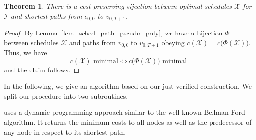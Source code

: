 \documentclass[hidelinks]{article}
\theoremstyle{plain}
\newtheorem{thm}{Theorem}[section]
\theoremstyle{definition}
\theoremstyle{rem}
\newcommand{\mx}{\mathcal{X}}
\newcommand{\inp}{\mathcal{I}}
\newcommand{\costs}{c}
\begin{document}
\begin{thm}\label{thm_opt_sched_short_path_pseudo_poly}
There is a cost-preserving bijection between optimal schedules $\mx$ for $\inp$ and shortest paths from $v_{0,0}$ to $v_{0,T+1}$.
\end{thm} 
\begin{proof}
By Lemma~\ref{lem_sched_path_pseudo_poly}, we have a bijection $\Phi$ between schedules $\mx$ and paths from $v_{0,0}$ to $v_{0,T+1}$ obeying $\costs(\mx)=\costs\bigl(\Phi(\mx)\bigr)$. Thus, we have 
\begin{equation*}
	\costs(\mx)\text{ minimal}\iff \costs\bigl(\Phi(\mx)\big)\text{ minimal}
\end{equation*}
and the claim follows.
\end{proof}
In the following, we give an algorithm based on our just verified construction. 
We split our procedure into two subroutines. 

 uses a dynamic programming approach similar to the well-known Bellman-Ford algorithm. It returns the minimum costs to all nodes as well as the predecessor of any node in respect to its shortest path.
\end{document}
